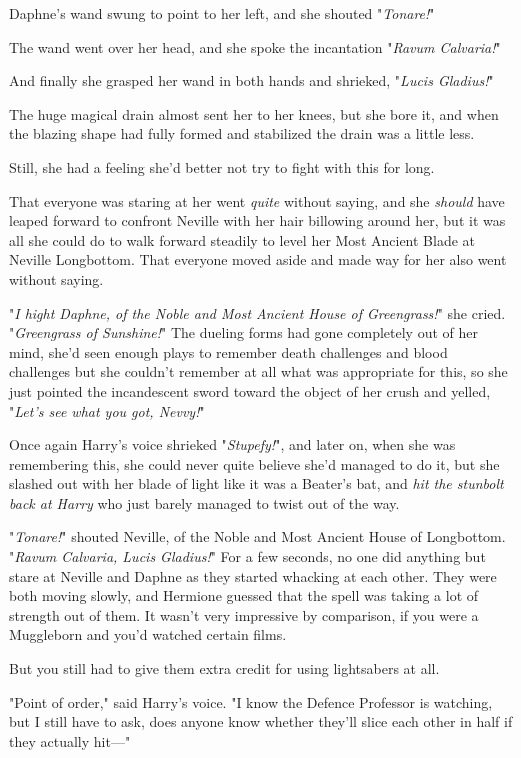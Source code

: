 Daphne's wand swung to point to her left, and she shouted "\emph{Tonare!}"

The wand went over her head, and she spoke the incantation "\emph{Ravum
Calvaria!}"

And finally she grasped her wand in both hands and shrieked, "\emph{Lucis
Gladius!}"

The huge magical drain almost sent her to her knees, but she bore it, and when
the blazing shape had fully formed and stabilized the drain was a little less.

Still, she had a feeling she'd better not try to fight with this for long.

That everyone was staring at her went \emph{quite} without saying, and she
\emph{should} have leaped forward to confront Neville with her hair billowing
around her, but it was all she could do to walk forward steadily to level her
Most Ancient Blade at Neville Longbottom. That everyone moved aside and made
way for her also went without saying.

"\emph{I hight Daphne, of the Noble and Most Ancient House of Greengrass!}" she
cried. "\emph{Greengrass of Sunshine!}" The dueling forms had gone completely
out of her mind, she'd seen enough plays to remember death challenges and blood
challenges but she couldn't remember at all what was appropriate for this, so
she just pointed the incandescent sword toward the object of her crush and
yelled, "\emph{Let's see what you got, Nevvy!}"

Once again Harry's voice shrieked "\emph{Stupefy!}", and later on, when she was
remembering this, she could never quite believe she'd managed to do it, but she
slashed out with her blade of light like it was a Beater's bat, and \emph{hit
the stunbolt back at Harry} who just barely managed to twist out of the way.

"\emph{Tonare!}" shouted Neville, of the Noble and Most Ancient House of
Longbottom. "\emph{Ravum Calvaria, Lucis Gladius!}"
\later
For a few seconds, no one did anything but stare at Neville and Daphne as they
started whacking at each other. They were both moving slowly, and Hermione
guessed that the spell was taking a lot of strength out of them. It wasn't very
impressive by comparison, if you were a Muggleborn and you'd watched certain
films.

But you still had to give them extra credit for using lightsabers at all.

"Point of order," said Harry's voice. "I know the Defence Professor is
watching, but I still have to ask, does anyone know whether they'll slice each
other in half if they actually hit—"

